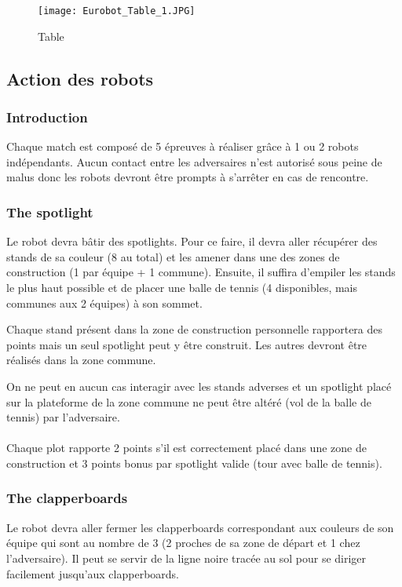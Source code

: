 \begin{figure}[!ht]
	\centering
	\texttt{[image: Eurobot\_Table\_1.JPG]}
	\caption{Table}
	\label{img:table}
\end{figure}

\subsection{Action des robots}
\subsubsection{Introduction}
Chaque match est composé de 5 épreuves à réaliser grâce à 1 ou 2 robots indépendants. Aucun contact entre les adversaires n’est autorisé sous peine de malus donc les robots devront être prompts à s’arrêter en cas de rencontre.

\subsubsection{The spotlight}
Le robot devra bâtir des spotlights. Pour ce faire, il devra aller récupérer des stands de sa couleur (8 au total) et les amener dans une des zones de construction (1 par équipe + 1 commune).  Ensuite, il suffira d’empiler les stands le plus haut possible et de placer une balle de tennis (4 disponibles, mais communes aux 2 équipes) à son sommet.

\noindent Chaque stand présent dans la zone de construction personnelle rapportera des points mais un seul spotlight peut y être construit. Les autres devront être réalisés dans la zone commune.

\noindent On ne peut en aucun cas interagir avec les stands adverses et un spotlight placé sur la plateforme de la zone commune ne peut être altéré (vol de la balle de tennis) par l’adversaire.

\paragraph{}
Chaque plot rapporte 2 points s’il est correctement placé dans une zone de construction et 3 points bonus par spotlight valide (tour avec balle de tennis).

\subsubsection{The clapperboards}
Le robot devra aller fermer les clapperboards correspondant aux couleurs de son équipe qui sont au nombre de 3 (2 proches de sa zone de départ et 1 chez l’adversaire). Il peut se servir de la ligne noire tracée au sol pour se diriger facilement jusqu’aux clapperboards.

